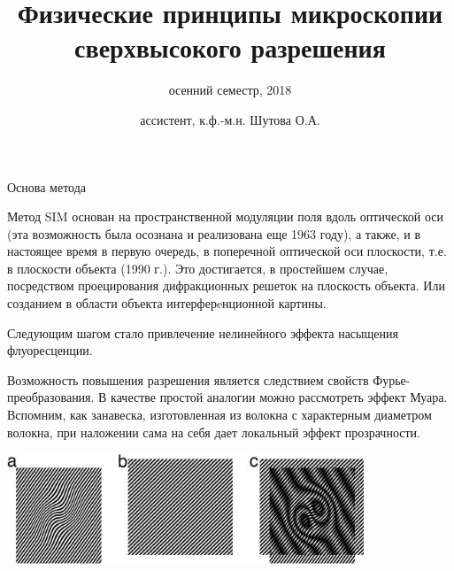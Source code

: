 \documentclass[9pt, compress, xcolor=table]{beamer}
\title{Физические принципы микроскопии сверхвысокого разрешения}
\subtitle{осенний семестр, 2018}
\author{ассистент, к.ф.-м.н. Шутова О.А.}
\institute{МГУ им. М.В. Ломоносова, физический факультет}
\begin{document}
\maketitle


\begin{frame}{Основа метода}

{\small Метод SIM основан на пространственной модуляции поля вдоль оптической оси (эта возможность была осознана и реализована еще 1963 году), а также, и в настоящее время в первую очередь, в поперечной оптической оси плоскости, т.е. в плоскости объекта (1990 г.). Это достигается, в простейшем случае, посредством проецирования дифракционных решеток на плоскость объекта. Или созданием в области объекта интерферeнционной картины.

Следующим шагом стало привлечение нелинейного эффекта насыщения флуоресценции.

Возможность повышения разрешения является следствием свойств Фурье-преобразования. В качестве простой аналогии можно рассмотреть эффект Муара. Вспомним, как занавеска, изготовленная из волокна с характерным диаметром волокна, при наложении сама на себя дает локальный эффект прозрачности.}

\begin{center}
\includegraphics[width=0.8\textwidth]{moire_2}
\end{center}

\end{frame}
\end{document}
